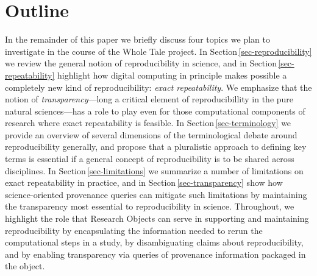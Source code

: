\section{Outline}
In the remainder of this paper 
we briefly discuss four topics we plan to investigate
	in the course of the Whole Tale project.
In Section\,\ref{sec-reproducibility} we review the general notion of
reproducibility in science, and in Section\,\ref{sec-repeatability} 
	highlight how digital computing in principle makes possible a completely new kind of reproducibility: 
	\emph{exact repeatability}. 
We emphasize that the notion of \emph{transparency}---long a critical element of
	reproducibillity in the pure natural sciences---has a role to play even for those computational components
	of research where exact repeatability is feasible.
In Section\,\ref{sec-terminology} we provide an overview of several dimensions of the terminological debate around reproducibility
	generally, and propose that a pluralistic approach to defining key terms is essential if a general 
	concept of reproducibility is to be shared across disciplines.
In Section\,\ref{sec-limitations} we summarize a number of limitations on exact repeatability in practice, and in Section\,\ref{sec-transparency}
	show how science-oriented provenance queries can mitigate such limitations by maintaining
 	the transparency most essential to reproducibility in science.
Throughout, we highlight the role that Research Objects \cite{bechhofer2013whya}
	can serve in supporting and maintaining reproducibility 
	by encapsulating the information needed to rerun the computational steps in a study, 
	by disambiguating claims about reproducibility, 
	and by enabling transparency via queries of provenance information packaged in the object. 
 

